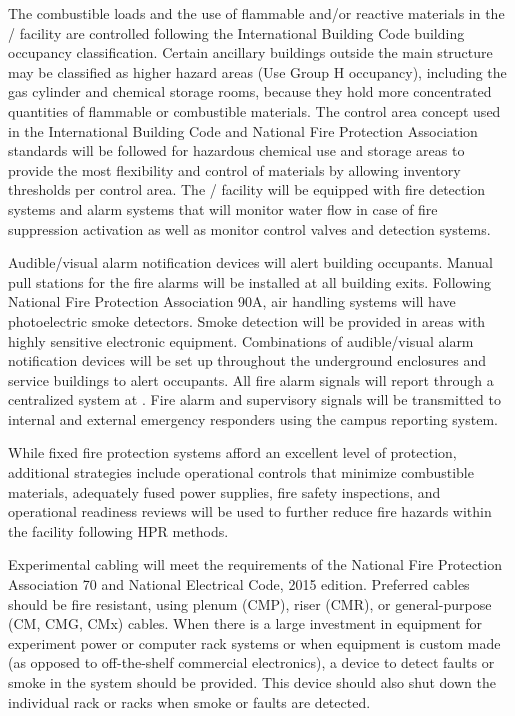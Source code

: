 The combustible loads and the use of flammable and/or reactive
materials in the / facility are controlled following
the International Building Code building occupancy
classification. Certain ancillary buildings outside the main structure
may be classified as higher hazard areas (Use Group H occupancy),
including the gas cylinder and chemical storage rooms, because they
hold more concentrated quantities of flammable or combustible
materials.  The control area concept used in the International Building Code and National Fire Protection Association standards will be followed for hazardous chemical use and storage
areas to provide the most flexibility and control of
materials by allowing inventory thresholds per control area.  The
/ facility will be equipped with fire detection systems and
alarm systems that will monitor water flow in case of fire suppression
activation as well as monitor control valves and detection systems.

Audible/visual alarm notification devices will alert building
occupants.  Manual pull stations for the fire alarms will be installed
at all building exits.  Following National Fire Protection Association 90A, air handling
systems will have photoelectric smoke detectors.  Smoke detection
will be provided in areas with highly sensitive electronic
equipment.  Combinations of audible/visual alarm notification devices will
be set up throughout the underground enclosures and service buildings
to alert occupants. All fire alarm signals will report through a
centralized system at \surf.  Fire alarm and supervisory signals will
be transmitted to internal and external emergency responders using
the campus reporting system.

While fixed fire protection systems afford an excellent level
of protection, additional strategies include operational controls
that minimize combustible materials, adequately
fused power supplies, fire safety inspections, and operational
readiness reviews will be used to further reduce fire hazards
within the facility following  HPR  methods.

Experimental cabling will meet the requirements of the National Fire Protection Association 70 and National
Electrical Code, 2015 edition.  Preferred cables should be fire
resistant, using plenum (CMP), riser (CMR), or general-purpose (CM, CMG, CMx) cables.   When there is a
large investment in equipment for
experiment power or computer rack systems or when equipment is
custom made (as opposed to off-the-shelf commercial electronics), a
device to detect faults or smoke in the system should be provided.
This device should also shut down the individual rack or racks when 
smoke or faults are detected.


